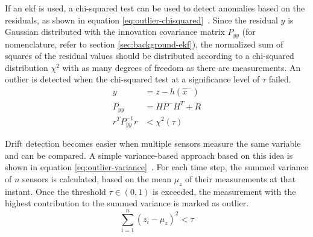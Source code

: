 If an \gls{ekf} is used, a chi-squared test can be used to detect anomalies based on the residuals, as shown in equation \ref{eq:outlier-chisquared}~\cites[p.~4292]{Hausman.2016}[p.~2050~f.]{Valls.2018}. Since the residual $y$ is Gaussian distributed with the innovation covariance matrix $P_{yy}$ (for nomenclature, refer to section \ref{sec:background-ekf}), the normalized sum of squares of the residual values should be distributed according to a chi-squared distribution $\chi^2$ with as many degrees of freedom as there are measurements. An outlier is detected when the chi-squared test at a significance level of $\tau$ failed.
\begin{subequations}\label{eq:outlier-chisquared}
\begin{alignat}{2}%
y &= z - h(\hat{x}^-) \\%
P_{yy} &= H P^- H^T + R \\%
r^T P_{yy}^{-1} r &< \chi^2(\tau)%
\end{alignat}
\end{subequations}

Drift detection becomes easier when multiple sensors measure the same variable and can be compared. A simple variance-based approach based on this idea is shown in equation \ref{eq:outlier-variance}~\cite[p.~20]{Kabzan.2019}. For each time step, the summed variance of $n$ sensors is calculated, based on the mean $\mu_z$ of their measurements at that instant. Once the threshold $\tau \in (0, 1)$ is exceeded, the measurement with the highest contribution to the summed variance is marked as outlier.
\begin{equation}\label{eq:outlier-variance}%
\sum_{i=1}^n (z_i - \mu_z)^2 < \tau%
\end{equation}

